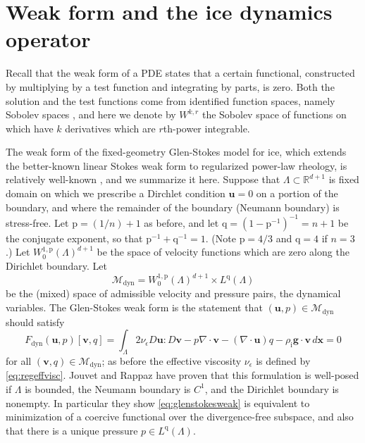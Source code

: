 \documentclass[letterpaper,final,12pt,reqno]{amsart}
\theoremstyle{claim}
\newcommand{\eps}{\epsilon}
\newcommand{\RR}{\mathbb{R}}
\newcommand{\Div}{\nabla\cdot}
\newcommand{\bg}{\mathbf{g}}
\newcommand{\bu}{\mathbf{u}}
\newcommand{\bv}{\mathbf{v}}
\newcommand{\bx}{\mathbf{x}}
\newcommand{\rhoi}{\rho_{\text{i}}}
\newcommand{\pp}{{\text{p}}}
\newcommand{\qq}{{\text{q}}}
\numberwithin{equation}{section}
\numberwithin{figure}{section}
\numberwithin{table}{section}
\numberwithin{theorem}{section}
\begin{document}
\section{Weak form and the ice dynamics operator} \label{sec:weakido}

Recall that the weak form of a PDE states that a certain functional, constructed by multiplying by a test function and integrating by parts, is zero.  Both the solution and the test functions come from identified function spaces, namely Sobolev spaces \cite{Evans2010}, and here we denote by $W^{k,r}$ the Sobolev space of functions on which have $k$ derivatives which are $r$th-power integrable.

The weak form of the fixed-geometry Glen-Stokes model for ice, which extends the better-known linear Stokes weak form \cite{Elmanetal2014} to regularized power-law rheology, is relatively well-known \cite{IsaacStadlerGhattas2015,JouvetRappaz2011,Lengetal2012}, and we summarize it here.  Suppose that $\Lambda \subset \RR^{d+1}$ is fixed domain on which we prescribe a Dirchlet condition $\bu=0$ on a portion of the boundary, and where the remainder of the boundary (Neumann boundary) is stress-free.  Let $\pp=(1/n)+1$ as before, and let $\qq=(1-\pp^{-1})^{-1}=n+1$ be the conjugate exponent, so that $\pp^{-1}+\qq^{-1}=1$. (Note $\pp=4/3$ and $\qq = 4$ if $n=3$.)  Let $W_0^{1,\pp}(\Lambda)^{d+1}$ be the space of velocity functions which are zero along the Dirichlet boundary.  Let
\begin{equation}
\mathcal{M}_{\text{dyn}} = W_0^{1,\pp}(\Lambda)^{d+1} \times L^\qq(\Lambda)  \label{eq:mixed}
\end{equation}
be the (mixed) space of admissible velocity and pressure pairs, the dynamical variables.  The Glen-Stokes weak form is the statement that $(\bu,p) \in \mathcal{M}_{\text{dyn}}$ should satisfy
\begin{equation}
F_{\text{dyn}}(\bu,p)[\bv,q] = \int_\Lambda 2 \nu_\eps D\bu : D\bv - p \Div\bv - (\Div\bu) q - \rhoi \bg \cdot \bv\,d\bx = 0 \label{eq:glenstokesweak}
\end{equation}
for all $(\bv,q) \in \mathcal{M}_{\text{dyn}}$; as before the effective viscosity $\nu_\eps$ is defined by \eqref{eq:regeffvisc}.  Jouvet and Rappaz \cite{JouvetRappaz2011} have proven that this formulation is well-posed if $\Lambda$ is bounded, the Neumann boundary is $C^1$, and the Dirichlet boundary is nonempty.  In particular they show \eqref{eq:glenstokesweak} is equivalent to minimization of a coercive functional over the divergence-free subspace, and also that there is a unique pressure $p\in L^\qq(\Lambda)$.
\end{document}
